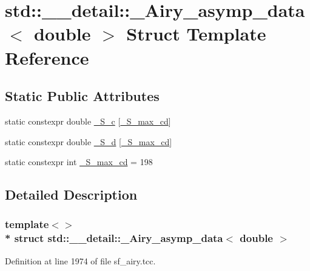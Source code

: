 \hypertarget{structstd_1_1____detail_1_1__Airy__asymp__data_3_01double_01_4}{}\section{std\+:\+:\+\_\+\+\_\+detail\+:\+:\+\_\+\+Airy\+\_\+asymp\+\_\+data$<$ double $>$ Struct Template Reference}
\label{structstd_1_1____detail_1_1__Airy__asymp__data_3_01double_01_4}
\subsection*{Static Public Attributes}
\begin{DoxyCompactItemize}
\item 
static constexpr double \hyperlink{structstd_1_1____detail_1_1__Airy__asymp__data_3_01double_01_4_a38e855b175c89166c4220cacd07ca1c7}{\+\_\+\+S\+\_\+c} \mbox{[}\hyperlink{structstd_1_1____detail_1_1__Airy__asymp__data_3_01double_01_4_a38e485184d2762e83a27937efc343d01}{\+\_\+\+S\+\_\+max\+\_\+cd}\mbox{]}
\item 
static constexpr double \hyperlink{structstd_1_1____detail_1_1__Airy__asymp__data_3_01double_01_4_aeaf6aab79b67a46932e9d16864ad0f78}{\+\_\+\+S\+\_\+d} \mbox{[}\hyperlink{structstd_1_1____detail_1_1__Airy__asymp__data_3_01double_01_4_a38e485184d2762e83a27937efc343d01}{\+\_\+\+S\+\_\+max\+\_\+cd}\mbox{]}
\item 
static constexpr int \hyperlink{structstd_1_1____detail_1_1__Airy__asymp__data_3_01double_01_4_a38e485184d2762e83a27937efc343d01}{\+\_\+\+S\+\_\+max\+\_\+cd} = 198
\end{DoxyCompactItemize}


\subsection{Detailed Description}
\subsubsection*{template$<$$>$\\*
struct std\+::\+\_\+\+\_\+detail\+::\+\_\+\+Airy\+\_\+asymp\+\_\+data$<$ double $>$}



Definition at line 1974 of file sf\+\_\+airy.\+tcc.



